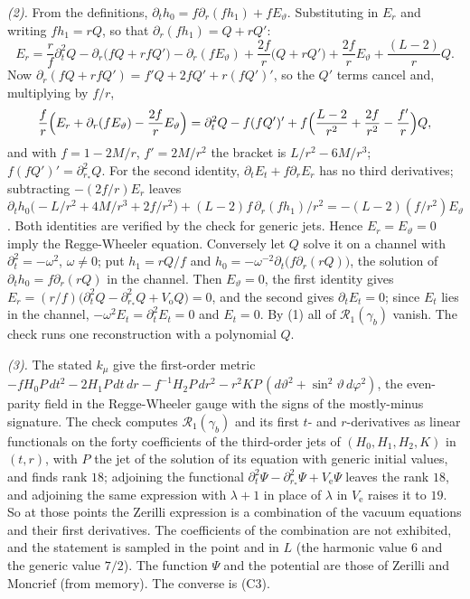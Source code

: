\emph{(2).} From the definitions, $\partial_{t}h_{0} = f\partial_{r}(fh_{1}) + fE_{\vartheta}$. Substituting in $E_{r}$ and writing $fh_{1} = rQ$, so that $\partial_{r}(fh_{1}) = Q + rQ'$:
\[
E_{r} = \frac{r}{f}\partial_{t}^{2}Q - \partial_{r}\bigl(fQ + rfQ'\bigr) - \partial_{r}(fE_{\vartheta}) + \frac{2f}{r}\bigl(Q + rQ'\bigr) + \frac{2f}{r}E_{\vartheta} + \frac{(L-2)}{r}Q .
\]
Now $\partial_{r}(fQ + rfQ') = f'Q + 2fQ' + r(fQ')'$, so the $Q'$ terms cancel and, multiplying by $f/r$,
\[
\frac{f}{r}\Bigl(E_{r} + \partial_{r}(fE_{\vartheta}) - \frac{2f}{r}E_{\vartheta}\Bigr) = \partial_{t}^{2}Q - f(fQ')' + f\Bigl(\frac{L - 2}{r^{2}} + \frac{2f}{r^{2}} - \frac{f'}{r}\Bigr)Q ,
\]
and with $f = 1 - 2M/r$, $f' = 2M/r^{2}$ the bracket is $L/r^{2} - 6M/r^{3}$; $f(fQ')' = \partial_{r_{*}}^{2}Q$. For the second identity, $\partial_{t}E_{t} + f\partial_{r}E_{r}$ has no third derivatives; subtracting $-(2f/r)E_{r}$ leaves $\partial_{t}h_{0}\bigl(-L/r^{2} + 4M/r^{3} + 2f/r^{2}\bigr) + (L-2)f\,\partial_{r}(fh_{1})/r^{2} = -(L-2)(f/r^{2})E_{\vartheta}$. Both identities are verified by the check for generic jets. Hence $E_{r} = E_{\vartheta} = 0$ imply the Regge-Wheeler equation. Conversely let $Q$ solve it on a channel with $\partial_{t}^{2} = -\omega^{2}$, $\omega \neq 0$; put $h_{1} = rQ/f$ and $h_{0} = -\omega^{-2}\partial_{t}\bigl(f\partial_{r}(rQ)\bigr)$, the solution of $\partial_{t}h_{0} = f\partial_{r}(rQ)$ in the channel. Then $E_{\vartheta} = 0$, the first identity gives $E_{r} = (r/f)\bigl(\partial_{t}^{2}Q - \partial_{r_{*}}^{2}Q + V_{\mathrm{o}}Q\bigr) = 0$, and the second gives $\partial_{t}E_{t} = 0$; since $E_{t}$ lies in the channel, $-\omega^{2}E_{t} = \partial_{t}^{2}E_{t} = 0$ and $E_{t} = 0$. By (1) all of $\mathcal{R}_{1}(\gamma_{b})$ vanish. The check runs one reconstruction with a polynomial $Q$.

\emph{(3).} The stated $k_{\mu}$ give the first-order metric $-fH_{0}P\,dt^{2} - 2H_{1}P\,dt\,dr - f^{-1}H_{2}P\,dr^{2} - r^{2}KP\,(d\vartheta^{2} + \sin^{2}\vartheta\,d\varphi^{2})$, the even-parity field in the Regge-Wheeler gauge with the signs of the mostly-minus signature. The check computes $\mathcal{R}_{1}(\gamma_{b})$ and its first $t$- and $r$-derivatives as linear functionals on the forty coefficients of the third-order jets of $(H_{0}, H_{1}, H_{2}, K)$ in $(t,r)$, with $P$ the jet of the solution of its equation with generic initial values, and finds rank $18$; adjoining the functional $\partial_{t}^{2}\Psi - \partial_{r_{*}}^{2}\Psi + V_{\mathrm{e}}\Psi$ leaves the rank $18$, and adjoining the same expression with $\lambda + 1$ in place of $\lambda$ in $V_{\mathrm{e}}$ raises it to $19$. So at those points the Zerilli expression is a combination of the vacuum equations and their first derivatives. The coefficients of the combination are not exhibited, and the statement is sampled in the point and in $L$ (the harmonic value $6$ and the generic value $7/2$). The function $\Psi$ and the potential are those of Zerilli and Moncrief (from memory). The converse is (C3).

